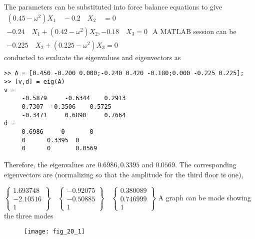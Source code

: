 \documentclass[../main.tex]{subfiles}
\begin{document}
\section{}
The parameters can be substituted into force balance equations to give
	\bigbreak
$
\begin{array}{c}
\left(0.45-\omega^{2}\right) X_{1} \quad-0.2 \quad X_{2} \quad=0\\
-0.24 \quad X_{1}+\left(0.42-\omega^{2}\right) X_{2},-0.18 \quad X_{3}=0\\
-0.225 \quad X_{2}+\left(0.225-\omega^{2}\right) X_{3}=0
\end{array}
$
	\bigbreak
A MATLAB session can be conducted to evaluate the eigenvalues and eigenvectors as
	\bigbreak
\begin{lstlisting}[numbers=none]
>> A = [0.450 -0.200 0.000;-0.240 0.420 -0.180;0.000 -0.225 0.225];
>> [v,d] = eig(A)
v =
	 -0.5879	 -0.6344 	0.2913
	 0.7307	 -0.3506 	0.5725
	 -0.3471	 0.6890 	0.7664
d =
	 0.6986 	0 		0
	 0 		0.3395 	0
	 0 		0 		0.0569
\end{lstlisting}
	\bigbreak
\begin{blockquote}
Therefore, the eigenvalues are $0.6986,0.3395$ and $0.0569$. The corresponding eigenvectors are (normalizing so that the amplitude for the third floor is one),
\end{blockquote}
	\bigbreak
$
\left\{\begin{array}{c}
1.693748 \\
-2.10516 \\
1
\end{array}\right\} \quad\left\{\begin{array}{c}
-0.92075 \\
-0.50885 \\
1
\end{array}\right\} \quad\left\{\begin{array}{c}
0.380089 \\
0.746999 \\
1
\end{array}\right\}
$
	\bigbreak
A graph can be made showing the three modes
	\bigbreak
	\begin{figure}[H]
		\texttt{[image: fig\_20\_1]}
		\label{fig:fig_20_1}
	\end{figure}
	\bigbreak
\end{document}
